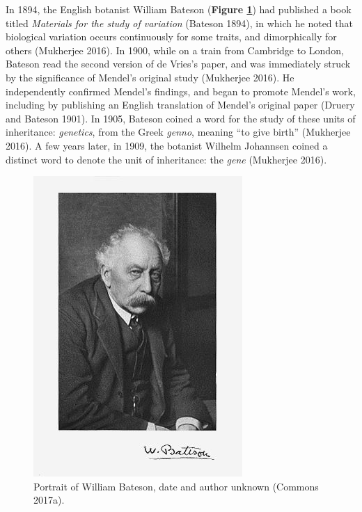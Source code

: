 \documentclass[
]{book}
\begin{document}
In 1894, the English botanist William Bateson (\textbf{Figure \ref{fig:bateson}}) had published a book titled \emph{Materials for the study of variation} (Bateson 1894), in which he noted that biological variation occurs continuously for some traits, and dimorphically for others (Mukherjee 2016). In 1900, while on a train from Cambridge to London, Bateson read the second version of de Vries's paper, and was immediately struck by the significance of Mendel's original study (Mukherjee 2016). He independently confirmed Mendel's findings, and began to promote Mendel's work, including by publishing an English translation of Mendel's original paper (Druery and Bateson 1901). In 1905, Bateson coined a word for the study of these units of inheritance: \emph{genetics}, from the Greek \emph{genno}, meaning ``to give birth'' (Mukherjee 2016). A few years later, in 1909, the botanist Wilhelm Johannsen coined a distinct word to denote the unit of inheritance: the \emph{gene} (Mukherjee 2016).



\begin{figure}

\hfill{}\includegraphics[width=1\linewidth]{figs/introduction/Bateson2} 

\caption{Portrait of William Bateson, date and author unknown (Commons 2017a).}\label{fig:bateson}
\end{figure}
\end{document}
